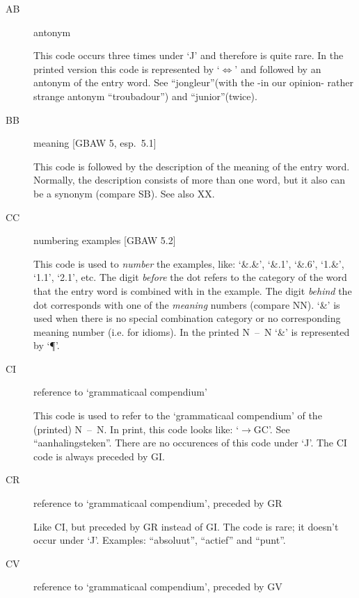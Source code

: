 \begin{description}

   \item [AB] antonym

         This code occurs three times under `J' and therefore is quite
         rare. In the printed version this code is represented by
         `$\Leftrightarrow$' and followed by an antonym of the entry word.
         See ``jongleur''(with the -in our opinion- rather strange antonym
         ``troubadour'') and ``junior''(twice).

   \item [BB] meaning [GBAW 5, esp.\ 5.1]

         This code is followed by the description of the meaning of the entry
         word. Normally, the description consists of more than one word, but it
         also can be a synonym (compare SB). See also XX.  

   \item [CC] numbering examples [GBAW 5.2]

	This code is used to {\em number} the examples, like: `\&.\&', `\&.1',
        `\&.6', `1.\&', `1.1', `2.1', etc. The digit {\em before} the dot refers
        to the category of the word that the entry word is combined with in the 
        example. 
        The digit {\em behind} the dot corresponds with one of the 
        {\em meaning} numbers (compare NN). `\&' is used when there is no
        special combination category or no corresponding meaning number (i.e.
        for idioms). In the printed N~--~N `\&' is represented by `\P'.

   \item [CI] reference to `grammaticaal compendium'

        This code is used to refer to the `gram\-ma\-ti\-caal com\-pen\-di\-um'
        of the
        (prin\-ted) N~--~N. In print, this code looks like: `$\rightarrow$GC'.
        See ``aan\-ha\-lings\-teken''. There are no occurences of this code 
        under `J'. The CI code is always preceded by GI. 

   \item [CR] reference to `grammaticaal compendium', preceded by GR

        Like CI, but preceded by GR instead of GI. The code is rare; it doesn't
        occur under `J'. Examples: ``absoluut'', ``actief'' and ``punt''. 


   \item [CV] reference to `grammaticaal compendium', preceded by GV


\end{description}
